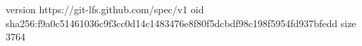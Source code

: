 version https://git-lfs.github.com/spec/v1
oid sha256:f9a0c51461036c9f3cc0d14c1483476e8f80f5dcbdf98c198f5954fd937bfedd
size 3764
